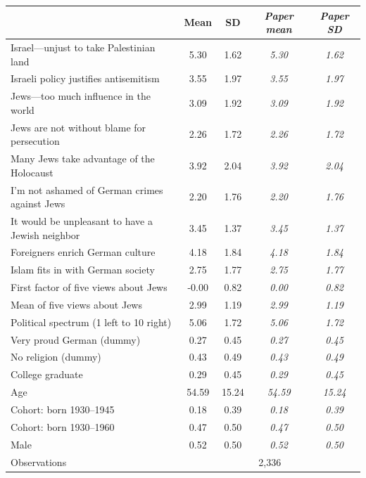 \begin{tabular}{lcccc}
\toprule
 & Mean & SD & \textit{Paper mean} & \textit{Paper SD} \\
\midrule
Israel---unjust to take Palestinian land & 5.30 & 1.62 & \textit{5.30} & \textit{1.62} \\
Israeli policy justifies antisemitism & 3.55 & 1.97 & \textit{3.55} & \textit{1.97} \\
Jews---too much influence in the world & 3.09 & 1.92 & \textit{3.09} & \textit{1.92} \\
Jews are not without blame for persecution & 2.26 & 1.72 & \textit{2.26} & \textit{1.72} \\
Many Jews take advantage of the Holocaust & 3.92 & 2.04 & \textit{3.92} & \textit{2.04} \\
I'm not ashamed of German crimes against Jews & 2.20 & 1.76 & \textit{2.20} & \textit{1.76} \\
It would be unpleasant to have a Jewish neighbor & 3.45 & 1.37 & \textit{3.45} & \textit{1.37} \\
Foreigners enrich German culture & 4.18 & 1.84 & \textit{4.18} & \textit{1.84} \\
Islam fits in with German society & 2.75 & 1.77 & \textit{2.75} & \textit{1.77} \\
First factor of five views about Jews & -0.00 & 0.82 & \textit{0.00} & \textit{0.82} \\
Mean of five views about Jews & 2.99 & 1.19 & \textit{2.99} & \textit{1.19} \\
Political spectrum (1 left to 10 right) & 5.06 & 1.72 & \textit{5.06} & \textit{1.72} \\
Very proud German (dummy) & 0.27 & 0.45 & \textit{0.27} & \textit{0.45} \\
No religion (dummy) & 0.43 & 0.49 & \textit{0.43} & \textit{0.49} \\
College graduate & 0.29 & 0.45 & \textit{0.29} & \textit{0.45} \\
Age & 54.59 & 15.24 & \textit{54.59} & \textit{15.24} \\
Cohort: born 1930--1945 & 0.18 & 0.39 & \textit{0.18} & \textit{0.39} \\
Cohort: born 1930--1960 & 0.47 & 0.50 & \textit{0.47} & \textit{0.50} \\
Male & 0.52 & 0.50 & \textit{0.52} & \textit{0.50} \\
\midrule
Observations & \multicolumn{4}{c}{2,336} \\
\bottomrule
\end{tabular}

